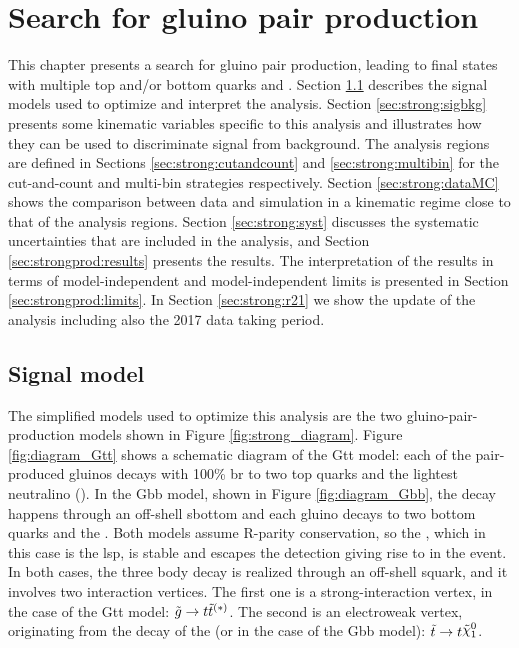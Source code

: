 \chapter{Search for gluino pair production}
\label{chap:strong_prod}

This chapter presents a search for gluino pair production, leading to final states with multiple top and/or bottom quarks and \met. 
Section \ref{sec:strong:signalmodel} describes the signal models used to optimize and interpret the analysis. 
Section \ref{sec:strong:sigbkg} presents some kinematic variables specific to this analysis and illustrates how they can be used to 
discriminate signal from background. 
The analysis regions are defined in Sections \ref{sec:strong:cutandcount} and \ref{sec:strong:multibin} for the cut-and-count and multi-bin strategies respectively. 
Section \ref{sec:strong:dataMC} shows the comparison between data and simulation in a kinematic regime close to that of the analysis regions. 
Section \ref{sec:strong:syst} discusses the systematic uncertainties that are included in the analysis, and Section \ref{sec:strongprod:results} 
presents the results. 
The interpretation of the results in terms of model-independent and model-independent limits is presented in Section \ref{sec:strongprod:limits}. 
In Section \ref{sec:strong:r21} we show the update of the analysis including also the 2017 data taking period.

\section{Signal model}
\label{sec:strong:signalmodel}

The simplified models used to optimize this analysis are the two gluino-pair-production models shown in Figure \ref{fig:strong_diagram}. 
Figure \ref{fig:diagram_Gtt} shows a schematic diagram of the Gtt model: 
each of the pair-produced gluinos decays with 100\% \gls{br} to two top quarks and the lightest neutralino (\ninoone).
In the Gbb model, shown in Figure \ref{fig:diagram_Gbb}, the decay happens through an off-shell sbottom and each gluino decays to 
two bottom quarks and the \ninoone. Both models assume R-parity conservation, so the \ninoone, which in this case is the \gls{lsp}, is stable 
and escapes the detection giving rise to \met in the event. In both cases, the three body decay is realized through an off-shell squark, 
and it involves two interaction vertices. The first one is a strong-interaction vertex, in the case of the Gtt model:
$\tilde{g} \to t \tilde{t}^{(*)}$.
The second is an electroweak vertex, originating from the decay of the \stop (or \sbottom in the case of the Gbb model):
$\stop \to t \ninoone$.

